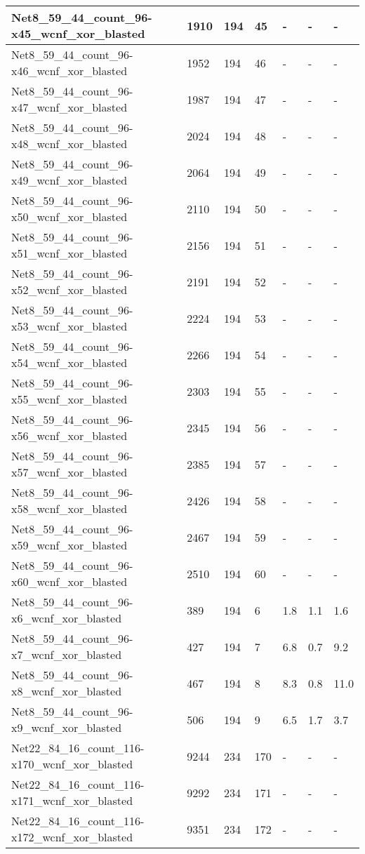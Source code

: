 \begin{scriptsize}
\begin{longtable}{|p{5cm}|l|l|l|l|l|l|}
Net8\_59\_44\_count\_96-x45\_wcnf\_xor\_blasted&1910&194&45&-&-&- \\ \hline 
Net8\_59\_44\_count\_96-x46\_wcnf\_xor\_blasted&1952&194&46&-&-&- \\ \hline 
Net8\_59\_44\_count\_96-x47\_wcnf\_xor\_blasted&1987&194&47&-&-&- \\ \hline 
Net8\_59\_44\_count\_96-x48\_wcnf\_xor\_blasted&2024&194&48&-&-&- \\ \hline 
Net8\_59\_44\_count\_96-x49\_wcnf\_xor\_blasted&2064&194&49&-&-&- \\ \hline 
Net8\_59\_44\_count\_96-x50\_wcnf\_xor\_blasted&2110&194&50&-&-&- \\ \hline 
Net8\_59\_44\_count\_96-x51\_wcnf\_xor\_blasted&2156&194&51&-&-&- \\ \hline 
Net8\_59\_44\_count\_96-x52\_wcnf\_xor\_blasted&2191&194&52&-&-&- \\ \hline 
Net8\_59\_44\_count\_96-x53\_wcnf\_xor\_blasted&2224&194&53&-&-&- \\ \hline 
Net8\_59\_44\_count\_96-x54\_wcnf\_xor\_blasted&2266&194&54&-&-&- \\ \hline 
Net8\_59\_44\_count\_96-x55\_wcnf\_xor\_blasted&2303&194&55&-&-&- \\ \hline 
Net8\_59\_44\_count\_96-x56\_wcnf\_xor\_blasted&2345&194&56&-&-&- \\ \hline 
Net8\_59\_44\_count\_96-x57\_wcnf\_xor\_blasted&2385&194&57&-&-&- \\ \hline 
Net8\_59\_44\_count\_96-x58\_wcnf\_xor\_blasted&2426&194&58&-&-&- \\ \hline 
Net8\_59\_44\_count\_96-x59\_wcnf\_xor\_blasted&2467&194&59&-&-&- \\ \hline 
Net8\_59\_44\_count\_96-x60\_wcnf\_xor\_blasted&2510&194&60&-&-&- \\ \hline 
Net8\_59\_44\_count\_96-x6\_wcnf\_xor\_blasted&389&194&6&1.8&1.1&1.6 \\ \hline 
Net8\_59\_44\_count\_96-x7\_wcnf\_xor\_blasted&427&194&7&6.8&0.7&9.2 \\ \hline 
Net8\_59\_44\_count\_96-x8\_wcnf\_xor\_blasted&467&194&8&8.3&0.8&11.0 \\ \hline 
Net8\_59\_44\_count\_96-x9\_wcnf\_xor\_blasted&506&194&9&6.5&1.7&3.7 \\ \hline 
Net22\_84\_16\_count\_116-x170\_wcnf\_xor\_blasted&9244&234&170&-&-&- \\ \hline 
Net22\_84\_16\_count\_116-x171\_wcnf\_xor\_blasted&9292&234&171&-&-&- \\ \hline 
Net22\_84\_16\_count\_116-x172\_wcnf\_xor\_blasted&9351&234&172&-&-&- \\ \hline 

\end{longtable}
\end{scriptsize}
